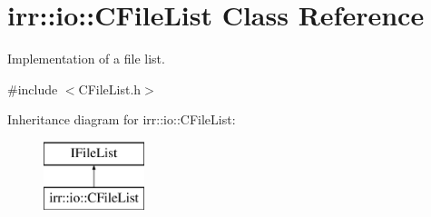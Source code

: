 \hypertarget{classirr_1_1io_1_1_c_file_list}{\section{irr\-:\-:io\-:\-:C\-File\-List Class Reference}
\label{classirr_1_1io_1_1_c_file_list}
}


Implementation of a file list.  




{\ttfamily \#include $<$C\-File\-List.\-h$>$}

Inheritance diagram for irr\-:\-:io\-:\-:C\-File\-List\-:\begin{figure}[H]
\begin{center}
\leavevmode
\includegraphics[height=2.000000cm]{classirr_1_1io_1_1_c_file_list}
\end{center}
\end{figure}
